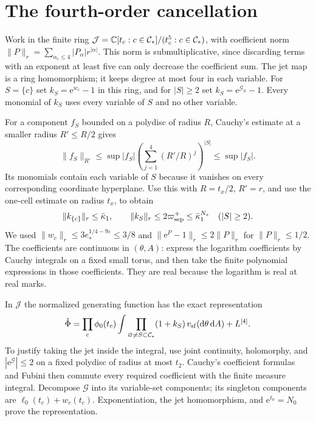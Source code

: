 \section{The fourth-order cancellation}
\label{subsec:interacting-fourth-jet}

Work in the finite ring
$\mathcal J=\mathbb C[t_c:c\in\mathcal C_*]/(t_c^5:c\in\mathcal C_*)$,
with coefficient norm
$\|P\|_r=\sum_{\alpha_c\le4}|P_\alpha|r^{|\alpha|}$.
This norm is submultiplicative, since discarding
terms with an exponent at least five can only
decrease the coefficient sum.
The jet map is a ring homomorphism; it
keeps degree at most four in each variable.
For $S=\{c\}$ set $k_S=\mathrm e^{w_c}-1$ in this
ring, and for $|S|\ge2$ set
$k_S=\mathrm e^{\mathcal G_S}-1$.
Every monomial of $k_S$ uses every variable
of $S$ and no other variable.

For a component $f_S$ bounded on a polydisc
of radius $R$, Cauchy's estimate at a smaller
radius $R'\le R/2$ gives
\[
 \|f_S\|_{R'}\le\sup|f_S|
             \left(\sum_{j=1}^4(R'/R)^j\right)^{|S|}
                         \le\sup|f_S|.
\]
Its monomials contain each variable of $S$
because it vanishes on every corresponding
coordinate hyperplane. Use this with
$R=t_x/2$, $R'=r$, and use the one-cell
estimate on radius $t_x$, to obtain
\begin{equation}\label{eq:interacting-error-jets}
 \|k_{\{c\}}\|_r\le\bar\kappa_1,\qquad
 \|k_S\|_r\le2\varpi_{\rm sep}^+
                       \le\bar\kappa_1^{N_*}\quad(|S|\ge2).
\end{equation}
We used $\|w_c\|_r\le3e_*^{1/4-9\varepsilon}\le3/8$
and $\|\mathrm e^P-1\|_r\le2\|P\|_r$ for $\|P\|_r\le1/2$.
The coefficients are continuous in $(\theta,A)$:
express the logarithm coefficients by Cauchy
integrals on a fixed small torus, and then
take the finite polynomial expressions in
those coefficients. They are real because
the logarithm is real at real marks.

In $\mathcal J$ the normalized generating
function has the exact representation
\begin{equation}\label{eq:interacting-jet-representation}
 \mathring\Phi=
   \prod_c\phi_0(t_c)
       \int\prod_{\varnothing\ne S\subset\mathcal C_*}
                         (1+k_S)\,v_{\rm sf}(\mathrm d\theta\,\mathrm d A)
       +L^{[4]}.
\end{equation}
To justify taking the jet inside the integral,
use joint continuity, holomorphy, and
$|\mathrm e^{\mathcal G}|\le2$ on a fixed
polydisc of radius at most $t_2$.
Cauchy's coefficient formulas and Fubini
then commute every required coefficient
with the finite measure integral.
Decompose $\mathcal G$ into its variable-set
components; its singleton components are
$\ell_0(t_c)+w_c(t_c)$.
Exponentiation, the jet homomorphism,
and $\mathrm e^{\ell_0}=N_0$ prove the representation.

